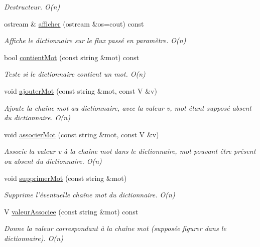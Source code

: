 \begin{DoxyCompactItemize}
\begin{DoxyCompactList}\small\item\em Destructeur. O(n) \end{DoxyCompactList}\item 
ostream \& \hyperlink{classhash__dictionnaire_a900870781ea0d8b4d6821bef1046495a}{afficher} (ostream \&os=cout) const 
\begin{DoxyCompactList}\small\item\em Affiche le dictionnaire sur le flux passé en paramètre. O(n) \end{DoxyCompactList}\item 
bool \hyperlink{classhash__dictionnaire_a4e39ddc24269bbec246bdf0180670643}{contient\-Mot} (const string \&mot) const 
\begin{DoxyCompactList}\small\item\em Teste si le dictionnaire contient un mot. O(n) \end{DoxyCompactList}\item 
void \hyperlink{classhash__dictionnaire_a7686074b9b747fd3be2423d0faffa546}{ajouter\-Mot} (const string \&mot, const V \&v)
\begin{DoxyCompactList}\small\item\em Ajoute la chaîne mot au dictionnaire, avec la valeur v, mot étant supposé absent du dictionnaire. O(n) \end{DoxyCompactList}\item 
void \hyperlink{classhash__dictionnaire_aa018c9fc0e0a343cf2c30ba4d9a5fc1e}{associer\-Mot} (const string \&mot, const V \&v)
\begin{DoxyCompactList}\small\item\em Associe la valeur v à la chaîne mot dans le dictionnaire, mot pouvant être présent ou absent du dictionnaire. O(n) \end{DoxyCompactList}\item 
void \hyperlink{classhash__dictionnaire_a65edff55e6785b5d6d6db97293330368}{supprimer\-Mot} (const string \&mot)
\begin{DoxyCompactList}\small\item\em Supprime l'éventuelle chaîne mot du dictionnaire. O(n) \end{DoxyCompactList}\item 
V \hyperlink{classhash__dictionnaire_a7b7b3c0023fa68a6932d839feda7c1f2}{valeur\-Associee} (const string \&mot) const 
\begin{DoxyCompactList}\small\item\em Donne la valeur correspondant à la chaîne mot (supposée figurer dans le dictionnaire). O(n) \end{DoxyCompactList}\item 

\end{DoxyCompactItemize}
